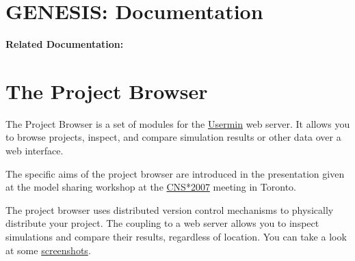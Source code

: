 \documentclass[12pt]{article}
\begin{document}
\section*{GENESIS: Documentation}

{\bf Related Documentation:}

\section*{The Project Browser}

The Project Browser is a set of modules for the \href{http://www.webmin.com/usermin.html}{Usermin} web server. It allows you to browse projects, inspect, and compare simulation results or other data over a web interface.

The specific aims of the project browser are introduced in the presentation given at the model sharing workshop at the \href{../cns07-poster/cns07-poster.pdf}{CNS*2007} meeting in Toronto.

The project browser uses distributed version control mechanisms to physically distribute your project. The coupling to a web server allows you to inspect simulations and compare their results, regardless of location. You can take a look at some \href{../project-browser-screenshots/project-browser-screenshots.tex}{screenshots}. 
\end{document}
